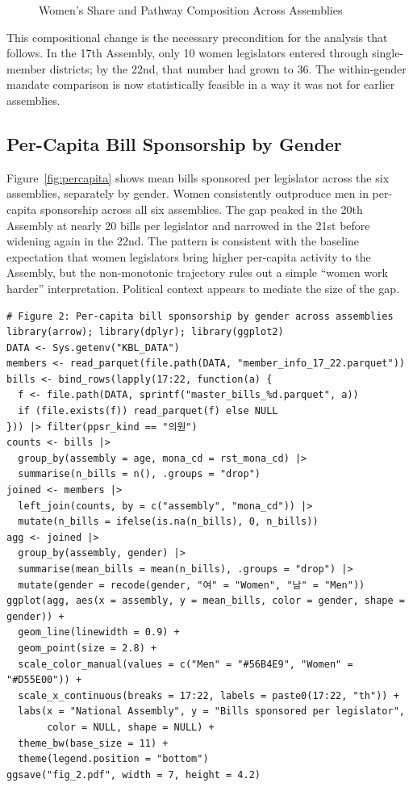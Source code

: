 \documentclass[11pt]{article}
\begin{document}
\begin{figure}[H]
\centering
{}
\caption{Women's Share and Pathway Composition Across Assemblies}
\label{fig:entrypath}
\end{figure}

This compositional change is the necessary precondition for the analysis that follows. In the 17th Assembly, only 10 women legislators entered through single-member districts; by the 22nd, that number had grown to 36. The within-gender mandate comparison is now statistically feasible in a way it was not for earlier assemblies.

\subsection{Per-Capita Bill Sponsorship by Gender}

Figure~\ref{fig:percapita} shows mean bills sponsored per legislator across the six assemblies, separately by gender. Women consistently outproduce men in per-capita sponsorship across all six assemblies. The gap peaked in the 20th Assembly at nearly 20 bills per legislator and narrowed in the 21st before widening again in the 22nd. The pattern is consistent with the baseline expectation that women legislators bring higher per-capita activity to the Assembly, but the non-monotonic trajectory rules out a simple ``women work harder'' interpretation. Political context appears to mediate the size of the gap.

\begin{verbatim}
# Figure 2: Per-capita bill sponsorship by gender across assemblies
library(arrow); library(dplyr); library(ggplot2)
DATA <- Sys.getenv("KBL_DATA")
members <- read_parquet(file.path(DATA, "member_info_17_22.parquet"))
bills <- bind_rows(lapply(17:22, function(a) {
  f <- file.path(DATA, sprintf("master_bills_%d.parquet", a))
  if (file.exists(f)) read_parquet(f) else NULL
})) |> filter(ppsr_kind == "의원")
counts <- bills |>
  group_by(assembly = age, mona_cd = rst_mona_cd) |>
  summarise(n_bills = n(), .groups = "drop")
joined <- members |>
  left_join(counts, by = c("assembly", "mona_cd")) |>
  mutate(n_bills = ifelse(is.na(n_bills), 0, n_bills))
agg <- joined |>
  group_by(assembly, gender) |>
  summarise(mean_bills = mean(n_bills), .groups = "drop") |>
  mutate(gender = recode(gender, "여" = "Women", "남" = "Men"))
ggplot(agg, aes(x = assembly, y = mean_bills, color = gender, shape = gender)) +
  geom_line(linewidth = 0.9) +
  geom_point(size = 2.8) +
  scale_color_manual(values = c("Men" = "#56B4E9", "Women" = "#D55E00")) +
  scale_x_continuous(breaks = 17:22, labels = paste0(17:22, "th")) +
  labs(x = "National Assembly", y = "Bills sponsored per legislator",
       color = NULL, shape = NULL) +
  theme_bw(base_size = 11) +
  theme(legend.position = "bottom")
ggsave("fig_2.pdf", width = 7, height = 4.2)
\end{verbatim}
\end{document}
